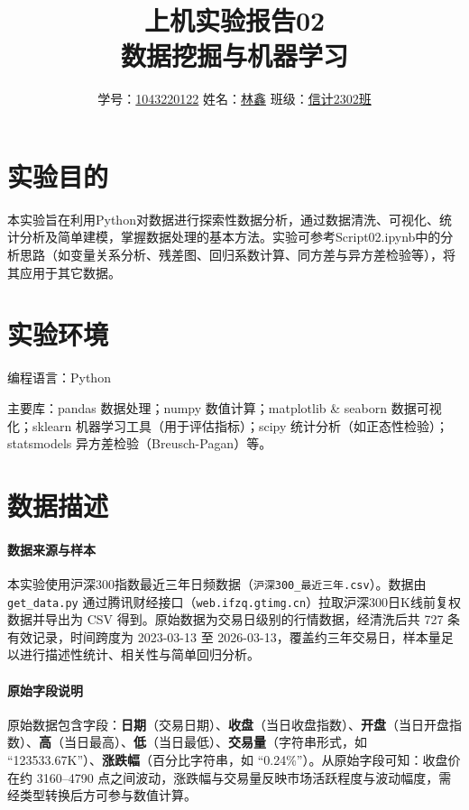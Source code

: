\documentclass[12pt,a4paper]{article}
\title{\textbf{上机实验报告02\\数据挖掘与机器学习}}
\author{学号：\underline{1043220122} \quad 姓名：\underline{林鑫} \quad 班级：\underline{信计2302班}}
\date{}
\begin{document}
\maketitle
\thispagestyle{empty}
\vspace{1em}

\section{实验目的}
本实验旨在利用Python对数据进行探索性数据分析，通过数据清洗、可视化、统计分析及简单建模，掌握数据处理的基本方法。实验可参考Script02.ipynb中的分析思路（如变量关系分析、残差图、回归系数计算、同方差与异方差检验等），将其应用于其它数据。

\section{实验环境}
编程语言：Python

主要库：pandas 数据处理；numpy 数值计算；matplotlib \& seaborn 数据可视化；sklearn 机器学习工具（用于评估指标）；scipy 统计分析（如正态性检验）；statsmodels 异方差检验（Breusch-Pagan）等。

\section{数据描述}
\paragraph{数据来源与样本} 本实验使用沪深300指数最近三年日频数据（\texttt{沪深300\_最近三年.csv}）。数据由 \texttt{get\_data.py} 通过腾讯财经接口（\texttt{web.ifzq.gtimg.cn}）拉取沪深300日K线前复权数据并导出为 CSV 得到。原始数据为交易日级别的行情数据，经清洗后共 727 条有效记录，时间跨度为 2023-03-13 至 2026-03-13，覆盖约三年交易日，样本量足以进行描述性统计、相关性与简单回归分析。

\paragraph{原始字段说明} 原始数据包含字段：\textbf{日期}（交易日期）、\textbf{收盘}（当日收盘指数）、\textbf{开盘}（当日开盘指数）、\textbf{高}（当日最高）、\textbf{低}（当日最低）、\textbf{交易量}（字符串形式，如 ``123533.67K''）、\textbf{涨跌幅}（百分比字符串，如 ``0.24\%''）。从原始字段可知：收盘价在约 3160--4790 点之间波动，涨跌幅与交易量反映市场活跃程度与波动幅度，需经类型转换后方可参与数值计算。
\end{document}
